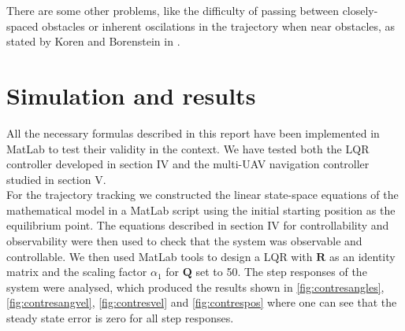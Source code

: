 \documentclass[journal]{IEEEtran}
\newcommand*{\subb}[1]{_{\mathrm{#1}}}
\begin{document}
%	
		
		There are some other problems, like the difficulty of passing between closely-spaced obstacles or inherent oscilations in the trajectory when near obstacles, as stated by Koren and Borenstein in \cite{koren_pot_fields_limitations}. 
	
	\section{Simulation and results}
	All the necessary formulas described in this report have been implemented in MatLab to test their validity in the context. We have tested both the LQR controller developed in section IV and the multi-UAV navigation controller studied in section V. \\
	
	For the trajectory tracking we constructed the linear state-space equations of the mathematical model in a MatLab script using the initial starting position as the equilibrium point. The equations described in section IV for controllability and observability were then used to check that the system was observable and controllable.  We then used MatLab tools to design a LQR with $\bm{R}$ as an identity matrix and the scaling factor $\alpha\subb{1}$ for $\bm{Q}$ set to 50. The step responses of the system were analysed, which produced the results shown in \figurename{ \ref{fig:contresangles}}, \figurename{ \ref{fig:contresangvel}}, \figurename{ \ref{fig:contresvel}} and \figurename{ \ref{fig:contrespos}} where one can see that the steady state error is zero for all step responses.\\
\end{document}
